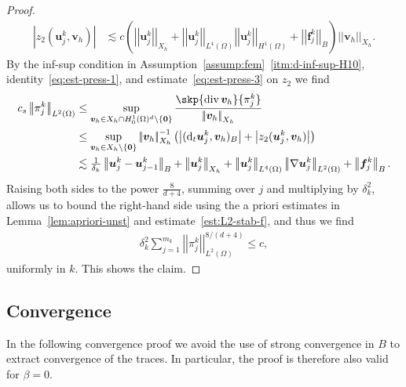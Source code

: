\documentclass[reqno,a4paper]{amsart}
\def\abs#1{\left| #1 \right|}
\def\norm#1{\left|\!\left| #1 \right|\!\right|}
\def\vec#1{\boldsymbol{#1}}
\def\diver{\mathop{\mathrm{div}}\nolimits} %
\def\d{{\rm d}}
\def\difft{\d_t}
\def\b0{\vec{0}}
\def\bf{\vec{f}}
\def\bu{\vec{u}}
\def\bv{\vec{v}}
\def\Xh{X_{h}}
\def\vz{{z_2}}
\begin{document}
\begin{proof}
	\begin{equation}\label{eq:est-press-3}
		\begin{aligned}
			\abs{\vz(\bu^k_j, \bv_h)} & \lesssim c
			\left( 
			\norm{ \bu_j^k}_{X_h} 
			+
			\norm{\bu^k_j}_{L^4(\Omega)} 	
			\norm{\bu^k_j}_{H^1(\Omega)}
			+ \norm{{\bf}_j^{k} }_{B}
			\right) \norm{ \bv_h}_{X_h}. 
		\end{aligned}
	\end{equation}
	By the inf-sup condition in Assumption~\ref{assump:fem}~\ref{itm:d-inf-sup-H10}, identity~\eqref{eq:est-press-1}, and estimate~\eqref{eq:est-press-3} on $z_2$ we find 
	\begin{equation} 
		\begin{aligned}\label{eq:est-press-2a}
			c_s \norm{\pi^k_j}_{L^{2}(\Omega)} 
			& \leq
			\sup_{\bv_h \in \Xh \cap H^1_0(\Omega)^d \setminus \{\b0\}} \frac{\skp{ \diver \bv_h}{ \pi_j^k } }{\norm{\bv_h}_{X_h} }\\
			&	\leq  
			\sup_{\bv_h \in \Xh\setminus \{\b0\}} \norm{\bv_h}_{X_h}^{-1} \left( 
			\abs{(\difft {\bu}^{k}_j,{\bv}_h)_B } + \abs{ \vz ( \bu^k_j,\bv_h)}\right)
			\\
			& \lesssim  \tfrac{1}{\delta_k} \norm{ \bu^k_{j} -  \bu^k_{j-1}}_B +   
			\norm{ \bu_j^k}_{X_h} 
			+ \norm{\bu^k_j}_{L^4(\Omega)} 	
			\norm{\nabla \bu^k_j}_{L^2(\Omega)} 
			+ \norm{{\bf}_j^{k} }_{B}. 
		\end{aligned}
	\end{equation}
	Raising both sides to the power $\frac{8}{d+4}$, summing over $j$ and multiplying by $\delta_k^2$, allows us to bound the right-hand side using the a priori estimates in Lemma~\ref{lem:apriori-unst} and estimate~\eqref{est:L2-stab-f}, and thus we find 
	\begin{align}\label{eq:est-press-5}
		\delta_k^2 \sum_{j = 1}^{m_k} \norm{\pi_j^k}_{L^2(\Omega)}^{8/(d+4)} \leq c,
	\end{align}
	uniformly in $k$. 
	This shows the claim. 
\end{proof}


\subsection{Convergence}\label{sec:unst-conv}

In the following convergence proof we avoid the use of  strong convergence in $B$ to extract convergence {of} the traces. 
In particular, the proof is therefore also valid for $\beta = 0$. 
\end{document}
